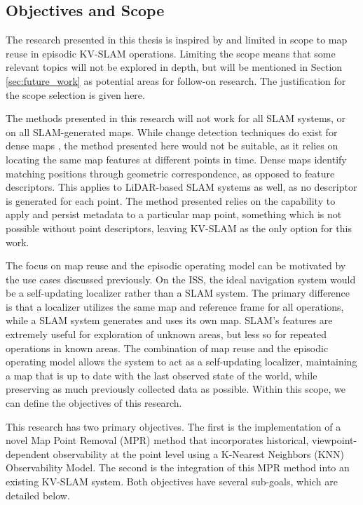 \subsection{Objectives and Scope}
\label{sec:objectives}

The research presented in this thesis is inspired by and limited in scope to map reuse in episodic KV-SLAM operations. Limiting the scope means that some relevant topics will not be explored in depth, but will be mentioned in Section \ref{sec:future_work} as potential areas for follow-on research. The justification for the scope selection is given here.

The methods presented in this research will not work for all SLAM systems, or on all SLAM-generated maps. While change detection techniques do exist for dense maps \cite{PLACEHOLDERa}, the method presented here would not be suitable, as it relies on locating the same map features at different points in time. Dense maps identify matching positions through geometric correspondence, as opposed to feature descriptors. This applies to LiDAR-based SLAM systems as well, as no descriptor is generated for each point. The method presented relies on the capability to apply and persist metadata to a particular map point, something which is not possible without point descriptors, leaving KV-SLAM as the only option for this work.

The focus on map reuse and the episodic operating model can be motivated by the use cases discussed previously. On the ISS, the ideal navigation system would be a self-updating localizer rather than a SLAM system. The primary difference is that a localizer utilizes the same map and reference frame for all operations, while a SLAM system generates and uses its own map. SLAM's features are extremely useful for exploration of unknown areas, but less so for repeated operations in known areas. The combination of map reuse and the episodic operating model allows the system to act as a self-updating localizer, maintaining a map that is up to date with the last observed state of the world, while preserving as much previously collected data as possible. Within this scope, we can define the objectives of this research.

This research has two primary objectives. The first is the implementation of a novel Map Point Removal (MPR) method that incorporates historical, viewpoint-dependent observability at the point level using a K-Nearest Neighbors (KNN) Observability Model. The second is the integration of this MPR method into an existing KV-SLAM system. Both objectives have several sub-goals, which are detailed below.

